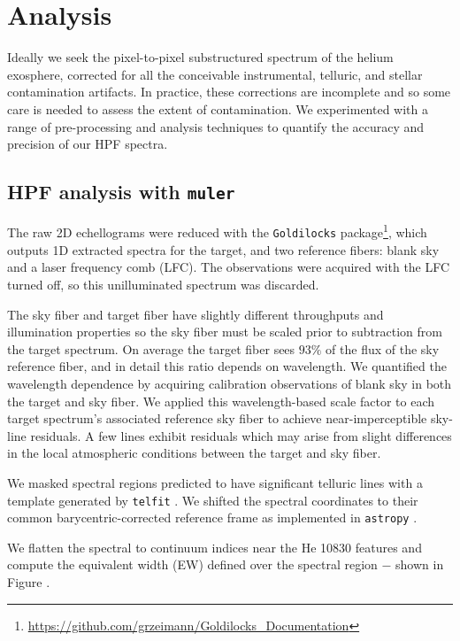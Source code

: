 \documentclass[modern]{aastex631}
\begin{document}
\section{Analysis}


Ideally we seek the pixel-to-pixel substructured spectrum of the helium exosphere, corrected for all the conceivable instrumental, telluric, and stellar contamination artifacts.  In practice, these corrections are incomplete and so some care is needed to assess the extent of contamination.  We experimented with a range of pre-processing and analysis techniques to quantify the accuracy and precision of our HPF spectra.

\subsection{HPF analysis with \texttt{muler} }

The raw 2D echellograms were reduced with the \texttt{Goldilocks} package\footnote{\url{https://github.com/grzeimann/Goldilocks_Documentation}}, which outputs 1D extracted spectra for the target, and two reference fibers: blank sky and a laser frequency comb (LFC).  The observations were acquired with the LFC turned off, so this unilluminated spectrum was discarded.

The sky fiber and target fiber have slightly different throughputs and illumination properties so the sky fiber must be scaled prior to subtraction from the target spectrum.  On average the target fiber sees $93\%$ of the flux of the sky reference fiber, and in detail this ratio depends on wavelength.  We quantified the wavelength dependence by acquiring calibration observations of blank sky in both the target and sky fiber.  We applied this wavelength-based scale factor to each target spectrum's associated reference sky fiber to achieve near-imperceptible sky-line residuals.  A few lines exhibit residuals which may arise from slight differences in the local atmospheric conditions between the target and sky fiber.

We masked spectral regions predicted to have significant telluric lines with a template generated by \texttt{telfit} \citep{2014AJ....148...53G}.  We shifted the spectral coordinates to their common barycentric-corrected reference frame \citep{2014PASP..126..838W} as implemented in \texttt{astropy} \citep{2013A&A...558A..33A,2018AJ....156..123A}.

We flatten the spectral to continuum indices near the He 10830 features and compute the equivalent width (EW) defined over the spectral region $-$ shown in Figure .
\end{document}
